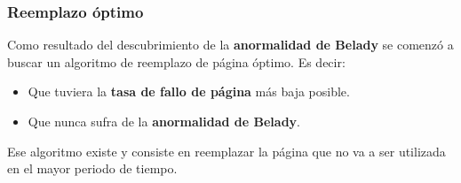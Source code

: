 \subsubsection{Reemplazo óptimo}\label{_reemplazo_uxf3ptimo}

{} {} Como resultado del descubrimiento de la \textbf{anormalidad de
Belady} se comenzó a buscar un algoritmo de reemplazo de página óptimo.
Es decir:

\begin{itemize}
\item
  Que tuviera la \textbf{tasa de fallo de página} más baja posible.
\item
  Que nunca sufra de la \textbf{anormalidad de Belady}.
\end{itemize}

Ese algoritmo existe y consiste en reemplazar la página que no va a ser
utilizada en el mayor periodo de tiempo.

